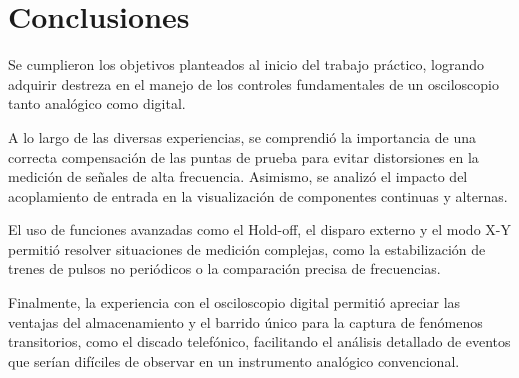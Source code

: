 \chapter{Conclusiones}

Se cumplieron los objetivos planteados al inicio del trabajo práctico, logrando adquirir destreza en el manejo de los
controles fundamentales de un osciloscopio tanto analógico como digital.

A lo largo de las diversas experiencias, se comprendió la importancia de una correcta compensación de las puntas de
prueba para evitar distorsiones en la medición de señales de alta frecuencia. Asimismo, se analizó el impacto del
acoplamiento de entrada en la visualización de componentes continuas y alternas.

El uso de funciones avanzadas como el Hold-off, el disparo externo y el modo X-Y permitió resolver situaciones de
medición complejas, como la estabilización de trenes de pulsos no periódicos o la comparación precisa de frecuencias.

Finalmente, la experiencia con el osciloscopio digital permitió apreciar las ventajas del almacenamiento y el barrido
único para la captura de fenómenos transitorios, como el discado telefónico, facilitando el análisis detallado de
eventos que serían difíciles de observar en un instrumento analógico convencional.
